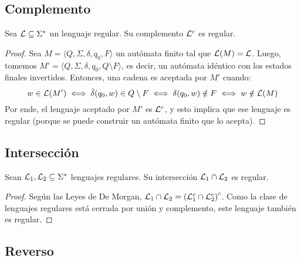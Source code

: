 \subsection{Complemento}

\begin{theorem*}
    Sea $\mathcal{L} \subseteq \Sigma^*$ un lenguaje regular. Su complemento $\mathcal{L}^c$ es regular.
\end{theorem*}
\begin{proof}
    Sea $M = \langle Q, \Sigma, \delta, q_0, F \rangle$ un autómata finito tal que $\mathcal{L}(M) = \mathcal{L}$. Luego, tomemos $M' = \langle Q, \Sigma, \delta, q_0, Q \setminus F \rangle$, es decir, un autómata idéntico con los estados finales invertidos. Entonces, una cadena es aceptada por $M'$ cuando:
    $$
        w \in \mathcal{L}(M') \iff \hat \delta(q_0, w) \in Q \setminus F \iff \delta(q_0, w) \notin F \iff w \notin \mathcal{L}(M)
    $$
    Por ende, el lenguaje aceptado por $M'$ es $\mathcal{L}^c$, y esto implica que ese lenguaje es regular (porque se puede construir un autómata finito que lo acepta).
\end{proof}

\subsection{Intersección}

\begin{theorem*}
    Sean $\mathcal{L}_1, \mathcal{L}_2 \subseteq \Sigma^*$ lenguajes regulares. Su intersección $\mathcal{L}_1 \cap \mathcal{L}_2$ es regular.
\end{theorem*}
\begin{proof}
    Según las Leyes de De Morgan, $\mathcal{L}_1 \cap \mathcal{L}_2 = \left(\mathcal{L}_1^c \cap \mathcal{L}_2^c\right)^c$. Como la clase de lenguajes regulares está cerrada por unión y complemento, este lenguaje también es regular.
\end{proof}

\subsection{Reverso}

